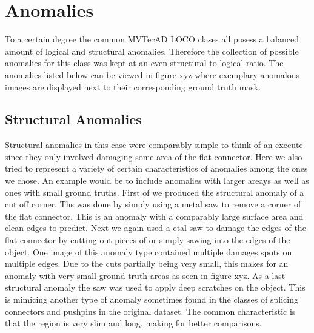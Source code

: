 \section{Anomalies}
\label{sec:flatconnectoranomalies}

To a certain degree the common MVTecAD LOCO clases all posess a balanced amount of logical and structural anomalies. Therefore the collection of possible anomalies for this class was kept at an even structural 
to logical ratio. The anomalies listed below can be viewed in figure xyz where exemplary anomalous images are displayed next to their corresponding ground truth mask.

\subsection{Structural Anomalies}
Structural anomalies in this case were comparably simple to think of an execute since they only involved damaging some area of the flat connector. Here we also tried to represent a variety of 
certain characteristics of anomalies among the ones we chose. An example would be to include anomalies with larger areays as well as ones with small ground truths.\newline
First of we produced the structural anomaly of a cut off corner. Ths was done by simply using a metal saw to remove a corner of the flat connector. This is an anomaly with a comparably large 
surface area and clean edges to predict. Next we again used a etal saw to damage the edges of the flat connector by cutting out pieces of or simply sawing into the edges of the object. One image 
of this anomaly type contained multiple damages spots on multiple edges. Due to the cuts partially being very small, this makes for an anomaly with very small ground truth areas as seen in figure 
xyz. As a last structural anomaly the saw was used to apply deep scratches on the object. This is mimicing another type of anomaly sometimes found in the classes of splicing connectors and pushpins 
in the original dataset. The common characteristic is that the region is very slim and long, making for better comparisons.


